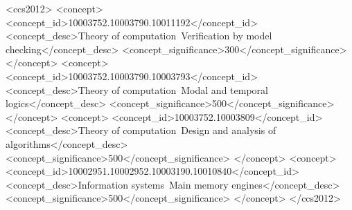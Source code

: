 \documentclass[sigconf]{acmart}
\begin{document}
\begin{CCSXML}
<ccs2012>
   <concept>
       <concept_id>10003752.10003790.10011192</concept_id>
       <concept_desc>Theory of computation~Verification by model checking</concept_desc>
       <concept_significance>300</concept_significance>
       </concept>
   <concept>
       <concept_id>10003752.10003790.10003793</concept_id>
       <concept_desc>Theory of computation~Modal and temporal logics</concept_desc>
       <concept_significance>500</concept_significance>
       </concept>
   <concept>
       <concept_id>10003752.10003809</concept_id>
       <concept_desc>Theory of computation~Design and analysis of algorithms</concept_desc>
       <concept_significance>500</concept_significance>
       </concept>
   <concept>
       <concept_id>10002951.10002952.10003190.10010840</concept_id>
       <concept_desc>Information systems~Main memory engines</concept_desc>
       <concept_significance>500</concept_significance>
       </concept>
 </ccs2012>
\end{CCSXML}

\newcommand{\spec}{\ensuremath{\Phi}}
\newcommand{\LOG}{\ensuremath{\mathfrak{S}}}



\maketitle
\end{document}
